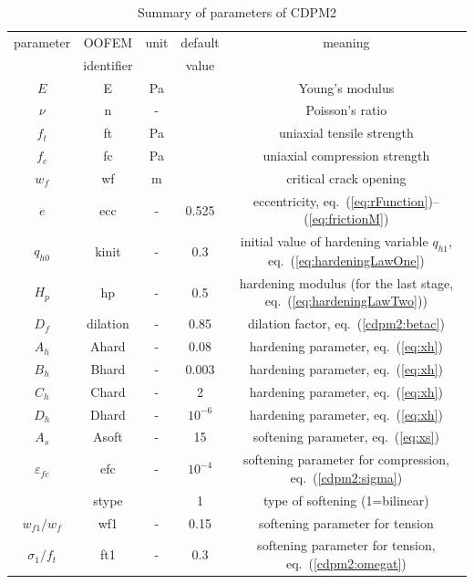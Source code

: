 \documentclass[a4paper]{article}
\begin{document}
\begin{table} [!h]
   \caption{Summary of parameters of CDPM2}
   \label{CDPM2-params}
   \centering
   \begin{tabular}{ | c | c | c | c | c |}
\hline
parameter & OOFEM & unit & default & meaning \\
 &   identifier      &  & value & \\
\hline
$E$ & E      &  Pa  &   & Young's modulus\\
$\nu$ & n      &  -  &  & Poisson's ratio \\
$f_t$ & ft      &  Pa  &  & uniaxial tensile strength \\
$f_c$ & fc      &  Pa  &  & uniaxial compression strength \\
$w_f$ & wf & m & & critical crack opening\\
$e$ & ecc & - & 0.525 & eccentricity, eq.~(\ref{eq:rFunction})--(\ref{eq:frictionM}) \\
$q_{h0}$ & kinit & - & 0.3 & initial value of hardening variable $q_{h1}$, eq.~(\ref{eq:hardeningLawOne})\\
$H_p$ & hp & - & 0.5 & hardening modulus (for the last stage, eq.~(\ref{eq:hardeningLawTwo}))\\
$D_f$ & dilation & - & 0.85 & dilation factor, eq.~(\ref{cdpm2:betac}) \\
$A_h$ & Ahard & - & 0.08 & hardening parameter, eq.~(\ref{eq:xh})\\
$B_h$ & Bhard & - & 0.003 & hardening parameter, eq.~(\ref{eq:xh}) \\
$C_h$ & Chard & - & 2 & hardening parameter, eq.~(\ref{eq:xh}) \\
$D_h$ & Dhard & - & $10^{-6}$ & hardening parameter, eq.~(\ref{eq:xh}) \\
$A_s$ & Asoft & - & 15 & softening parameter, eq.~(\ref{eq:xs})\\
$\varepsilon_{fc}$ & efc & - &$10^{-4}$ & softening parameter for compression, eq.~(\ref{cdpm2:sigma})  \\
 & stype &  & 1 & type of softening (1=bilinear) \\
$w_{f1}/w_f$ & wf1 & - & 0.15   & softening parameter for tension\\
$\sigma_1/f_t$ & ft1 & - & 0.3 &  softening parameter for tension, eq.~(\ref{cdpm2:omegat})\\
\hline
   \end{tabular}
\end{table}
\end{document}
